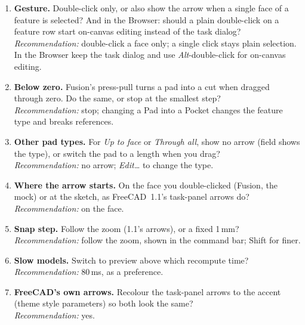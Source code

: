 \begin{enumerate}
  \item \textbf{Gesture.} Double-click only, or also show the arrow when a single face of a feature is selected?
        And in the Browser: should a plain double-click on a feature row start on-canvas editing instead of the task
        dialog?\\
        \emph{Recommendation:} double-click a face only; a single click stays plain selection. In the Browser keep
        the task dialog and use \emph{Alt}-double-click for on-canvas editing.
  \item \textbf{Below zero.} Fusion's press-pull turns a pad into a cut when dragged through zero. Do the same, or
        stop at the smallest step?\\
        \emph{Recommendation:} stop; changing a Pad into a Pocket changes the feature type and breaks references.
  \item \textbf{Other pad types.} For \emph{Up to face} or \emph{Through all}, show no arrow (field shows the type),
        or switch the pad to a length when you drag?\\
        \emph{Recommendation:} no arrow; \emph{Edit\ldots} to change the type.
  \item \textbf{Where the arrow starts.} On the face you double-clicked (Fusion, the mock) or at the sketch, as
        FreeCAD~1.1's task-panel arrows do?\\
        \emph{Recommendation:} on the face.
  \item \textbf{Snap step.} Follow the zoom (1.1's arrows), or a fixed 1\,mm?\\
        \emph{Recommendation:} follow the zoom, shown in the command bar; Shift for finer.
  \item \textbf{Slow models.} Switch to preview above which recompute time?\\
        \emph{Recommendation:} 80\,ms, as a preference.
  \item \textbf{FreeCAD's own arrows.} Recolour the task-panel arrows to the accent (theme style parameters) so both
        look the same?\\
        \emph{Recommendation:} yes.
\end{enumerate}
